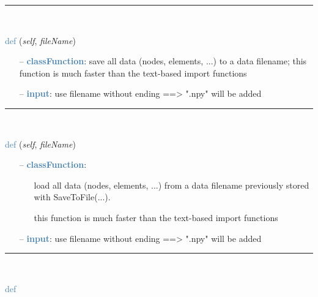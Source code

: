 \begin{itemize}[leftmargin=1.4cm]
\begin{itemize}[leftmargin=1.4cm]
\begin{itemize}[leftmargin=0.5cm]
\begin{itemize}[leftmargin=1.4cm]
\begin{itemize}[leftmargin=1.4cm]
\begin{itemize}[leftmargin=0.5cm]
%
\noindent\rule{8cm}{0.75pt}\vspace{1pt} \\ 
\begin{flushleft}
\noindent \textcolor{steelblue}{def {\bf {}}}\label{sec:FEM:FEMinterface:SaveToFile}
({\it self}, {\it fileName})
\end{flushleft}
\setlength{\itemindent}{0.7cm}
\begin{itemize}[leftmargin=0.7cm]
\item[--]\textcolor{steelblue}{\bf classFunction}: save all data (nodes, elements, ...) to a data filename; this function is much faster than the text-based import functions
\item[--]\textcolor{steelblue}{\bf input}: use filename without ending ==> ".npy" will be added
\vspace{12pt}\end{itemize}
%
\noindent\rule{8cm}{0.75pt}\vspace{1pt} \\ 
\begin{flushleft}
\noindent \textcolor{steelblue}{def {\bf {}}}\label{sec:FEM:FEMinterface:LoadFromFile}
({\it self}, {\it fileName})
\end{flushleft}
\setlength{\itemindent}{0.7cm}
\begin{itemize}[leftmargin=0.7cm]
\item[--]\textcolor{steelblue}{\bf classFunction}: \vspace{-6pt}
\begin{itemize}[leftmargin=1.2cm]
\setlength{\itemindent}{-0.7cm}
\item[]load all data (nodes, elements, ...) from a data filename previously stored with SaveToFile(...).
\item[]this function is much faster than the text-based import functions
\end{itemize}
\item[--]\textcolor{steelblue}{\bf input}: use filename without ending ==> ".npy" will be added
\vspace{12pt}\end{itemize}
%
\noindent\rule{8cm}{0.75pt}\vspace{1pt} \\ 
\begin{flushleft}
\noindent \textcolor{steelblue}{def {\bf {}}}\label{sec:FEM:FEMinterface:ImportFromAbaqusInputFile}

\end{flushleft}
\end{itemize}
\end{itemize}
\end{itemize}
\end{itemize}
\end{itemize}
\end{itemize}

